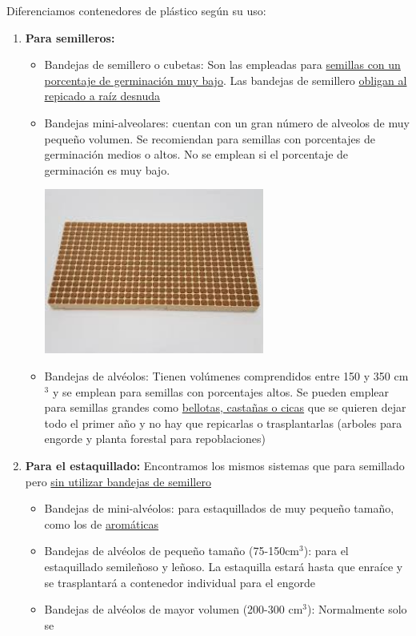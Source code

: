 \documentclass[a4paper,12pt,oneside]{article}
\begin{document}
\begin{enumerate}
Diferenciamos contenedores de plástico según su uso:
\begin{enumerate}
\item \textbf{Para semilleros:}
\begin{itemize}
\item Bandejas de semillero o cubetas: Son las empleadas para \uline{semillas con un
porcentaje de germinación muy bajo}. Las bandejas de semillero \uline{obligan al
repicado a raíz desnuda}
\item Bandejas mini-alveolares: cuentan con un gran número de alveolos de muy
pequeño volumen. Se recomiendan para semillas con porcentajes de
germinación medios o altos. No se emplean si el porcentaje de germinación
es muy bajo.
\begin{center}
\includegraphics[width=0.6\textwidth]{./img_uf1596/bandeja_multi.jpg}
\end{center}
\item Bandejas de alvéolos: Tienen volúmenes comprendidos entre 150 y 350 cm\(^{\text{3}}\) y
se emplean para semillas con porcentajes altos. Se pueden emplear para
semillas grandes como \uline{bellotas, castañas o cicas} que se quieren dejar
todo el primer año y no hay que repicarlas o trasplantarlas (arboles para
engorde y planta forestal para repoblaciones)
\end{itemize}
\item \textbf{Para el estaquillado:} Encontramos los mismos sistemas que para semillado
pero \uline{sin utilizar bandejas de semillero}
\begin{itemize}
\item Bandejas de mini-alvéolos: para estaquillados de muy pequeño tamaño, como
los de \uline{aromáticas}
\item Bandejas de alvéolos de pequeño tamaño (75-150cm\(^{\text{3}}\)): para el estaquillado
semileñoso y leñoso. La estaquilla estará hasta que enraíce y se
trasplantará a contenedor individual para el engorde
\item Bandejas de alvéolos de mayor volumen (200-300 cm\(^{\text{3}}\)): Normalmente solo se

\end{itemize}
\end{enumerate}
\end{enumerate}
\end{document}
